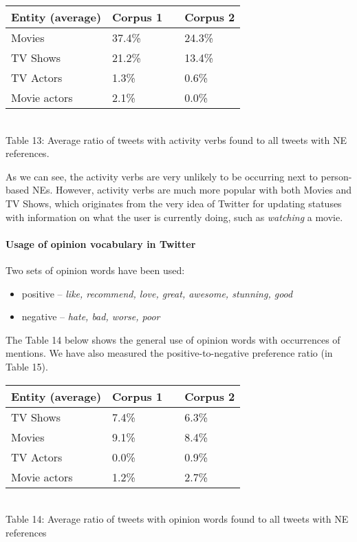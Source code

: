 \begin{center}
  \begin{tabular}{ | p{4cm} | p{2cm} | p{1cm}| p{2cm} | } \hline
    Entity (average) & Corpus 1 & & Corpus 2 \\ \hline
    Movies & 37.4\% & & 24.3\% \\ \hline
    TV Shows & 21.2\% & & 13.4\% \\ \hline
    TV Actors & 1.3\% & & 0.6\% \\ \hline
    Movie actors & 2.1\% & & 0.0\% \\ \hline
  \end{tabular} \\
  Table 13: Average ratio of tweets with activity verbs found to all tweets with NE references. \\
\end{center}

As we can see, the activity verbs are very unlikely to be occurring next to
person-based NEs. However, activity verbs are much more popular with both
Movies and TV Shows, which originates from the very idea of Twitter for
updating statuses with information on what the user is currently doing, such as \textit{watching}
a movie.

\paragraph{Usage of opinion vocabulary in Twitter}
Two sets of opinion words have been used:
\begin{itemize}
  \item positive -- \textit{like, recommend, love, great, awesome, stunning, good}
  \item negative -- \textit{hate, bad, worse, poor}
\end{itemize}

The Table 14 below shows the general use of opinion words with occurrences of
mentions. We have also measured the positive-to-negative preference ratio (in Table 15).

\begin{center}
  \begin{tabular}{ | p{4cm} | p{2cm} | p{1cm}| p{2cm} | } \hline
    Entity (average) & Corpus 1 & & Corpus 2 \\ \hline
    TV Shows & 7.4\% & & 6.3\% \\ \hline
    Movies & 9.1\% & & 8.4\% \\ \hline
    TV Actors & 0.0\% & & 0.9\% \\ \hline
    Movie actors & 1.2\% & & 2.7\% \\ \hline
  \end{tabular} \\
  Table 14: Average ratio of tweets with opinion words found to all tweets with NE references \\
\end{center}

